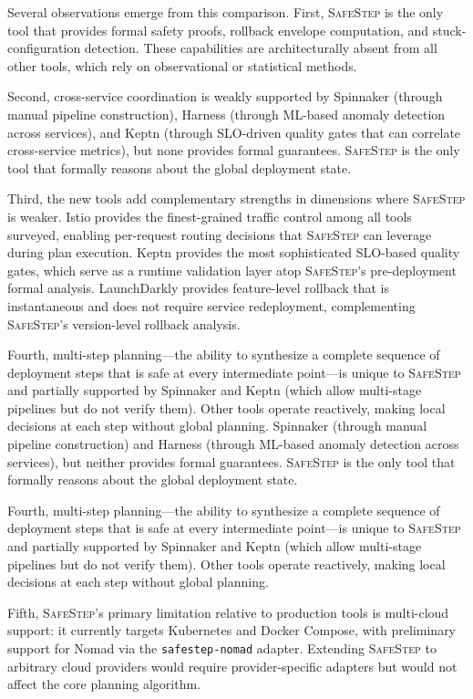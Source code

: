 \documentclass[10pt,twocolumn]{article}
\newcommand{\safestep}{\textsc{SafeStep}}
\begin{document}
Several observations emerge from this comparison.
First, \safestep{} is the only tool that provides formal safety
proofs, rollback envelope computation, and stuck-configuration
detection. These capabilities are architecturally absent from
all other tools, which rely on observational or statistical
methods.

Second, cross-service coordination is weakly supported by
Spinnaker (through manual pipeline construction), Harness
(through ML-based anomaly detection across services), and
Keptn (through SLO-driven quality gates that can correlate
cross-service metrics), but none provides formal guarantees.
\safestep{} is the only tool that formally reasons about the
global deployment state.

Third, the new tools add complementary strengths in dimensions
where \safestep{} is weaker. Istio provides the finest-grained
traffic control among all tools surveyed, enabling per-request
routing decisions that \safestep{} can leverage during plan
execution. Keptn provides the most sophisticated SLO-based
quality gates, which serve as a runtime validation layer atop
\safestep{}'s pre-deployment formal analysis. LaunchDarkly
provides feature-level rollback that is instantaneous and does
not require service redeployment, complementing \safestep{}'s
version-level rollback analysis.

Fourth, multi-step planning---the ability to synthesize a
complete sequence of deployment steps that is safe at every
intermediate point---is unique to \safestep{} and partially
supported by Spinnaker and Keptn (which allow multi-stage
pipelines but do not verify them). Other tools operate
reactively, making local decisions at each step without global
planning.
Spinnaker (through manual pipeline construction) and Harness
(through ML-based anomaly detection across services), but
neither provides formal guarantees. \safestep{} is the only
tool that formally reasons about the global deployment state.

Fourth, multi-step planning---the ability to synthesize a
complete sequence of deployment steps that is safe at every
intermediate point---is unique to \safestep{} and partially
supported by Spinnaker and Keptn (which allow multi-stage
pipelines but do not verify them). Other tools operate
reactively, making local decisions at each step without global
planning.

Fifth, \safestep{}'s primary limitation relative to production
tools is multi-cloud support: it currently targets Kubernetes
and Docker Compose, with preliminary support for Nomad via the
\texttt{safestep-nomad} adapter. Extending \safestep{} to
arbitrary cloud providers would require provider-specific
adapters but would not affect the core planning algorithm.
\end{document}
